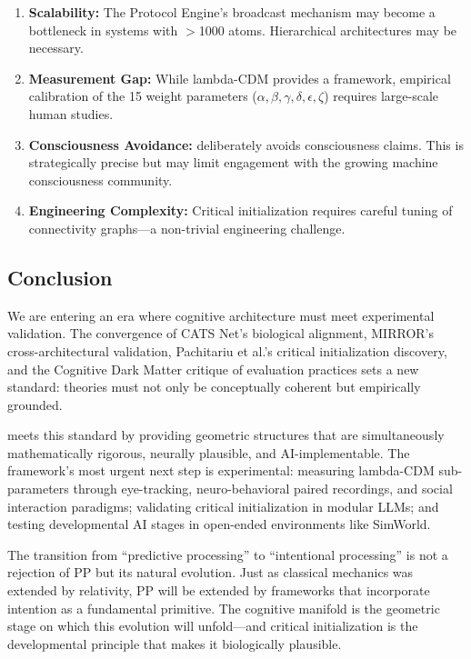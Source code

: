 \documentclass[11pt,a4paper]{article}
\theoremstyle{definition}
\theoremstyle{remark}
\newcommand{\CAA}{\text{CAA-X}}
\newcommand{\GWP}{\text{GWP}}
\begin{document}
\begin{enumerate}
    \item \textbf{Scalability:} The \GWP{} Protocol Engine's broadcast mechanism may become a bottleneck in systems with $>$1000 atoms. Hierarchical \GWP{} architectures may be necessary.
    \item \textbf{Measurement Gap:} While lambda-CDM provides a framework, empirical calibration of the 15 weight parameters ($\alpha, \beta, \gamma, \delta, \epsilon, \zeta$) requires large-scale human studies.
    \item \textbf{Consciousness Avoidance:} \CAA{} deliberately avoids consciousness claims. This is strategically precise but may limit engagement with the growing machine consciousness community.
    \item \textbf{Engineering Complexity:} Critical initialization requires careful tuning of connectivity graphs---a non-trivial engineering challenge.
\end{enumerate}

\subsection{Conclusion}\label{subsec:conclusion}

We are entering an era where cognitive architecture must meet experimental validation. The convergence of CATS Net's biological alignment, MIRROR's cross-architectural validation, Pachitariu et al.'s critical initialization discovery, and the Cognitive Dark Matter critique of evaluation practices sets a new standard: theories must not only be conceptually coherent but empirically grounded.

\CAA{} meets this standard by providing geometric structures that are simultaneously mathematically rigorous, neurally plausible, and AI-implementable. The framework's most urgent next step is experimental: measuring lambda-CDM sub-parameters through eye-tracking, neuro-behavioral paired recordings, and social interaction paradigms; validating critical initialization in modular LLMs; and testing developmental AI stages in open-ended environments like SimWorld.

The transition from ``predictive processing'' to ``intentional processing'' is not a rejection of PP but its natural evolution. Just as classical mechanics was extended by relativity, PP will be extended by frameworks that incorporate intention as a fundamental primitive. The cognitive manifold is the geometric stage on which this evolution will unfold---and critical initialization is the developmental principle that makes it biologically plausible.
\end{document}
